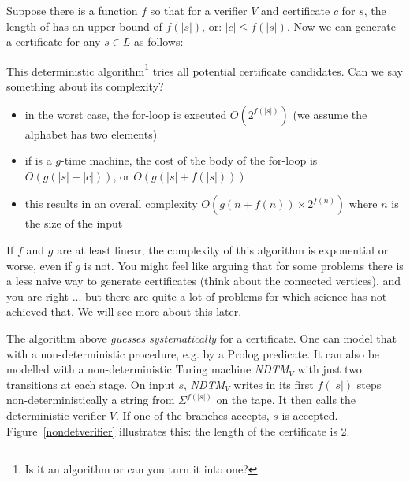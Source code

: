 Suppose there is a function $f$ so that for a verifier $V$ and
certificate $c$ for $s$, the length of  has an upper bound of
$f(|s|)$, or:
%
$|c| \leq f(|s|)$. Now we can generate a certificate for
any $s \in L$ as follows:

\begin{algorithmic}
         \EndIf
    \EndFor
\end{algorithmic}

This deterministic algorithm\footnote{Is it an algorithm or can you
turn it into one?} tries all potential certificate candidates. Can we
say something about its complexity?


\begin{itemize}
\item
in the worst case, the for-loop is executed $O(2^{f(|s|)})$  (we assume
the alphabet has two elements)
\item 
if  is a $g$-time machine, the cost of the body of the for-loop is
$O(g(|s|+|c|))$, or $O(g(|s|+f(|s|)))$
\item
this results in an overall complexity $O(g(n+f(n))\times 2^{f(n)})$
where $n$ is the size of the input
\end{itemize}

If $f$ and $g$ are at least linear, the complexity of this algorithm
is exponential or worse, even if $g$ is not. You might feel like
arguing that for some problems there is a less naive way to generate
certificates (think about the connected vertices), and you are right
... but there are quite a lot of problems for which science has not
achieved that. We will see more about this later.

The algorithm above {\em guesses systematically} for a
certificate. One can model that with a non-deterministic procedure,
e.g. by a Prolog predicate. It can also be modelled with a
non-deterministic Turing machine {\em NDTM$_V$} with just two
transitions at each stage. On input $s$, {\em NDTM$_V$} writes in its
first $f(|s|)$ steps non-deterministically a string from
$\Sigma^{f(|s|)}$ on the tape. It then calls the deterministic
verifier $V$. If one of the branches accepts, $s$ is accepted.
Figure~\ref{nondetverifier} illustrates this: the length of the
certificate is 2.



